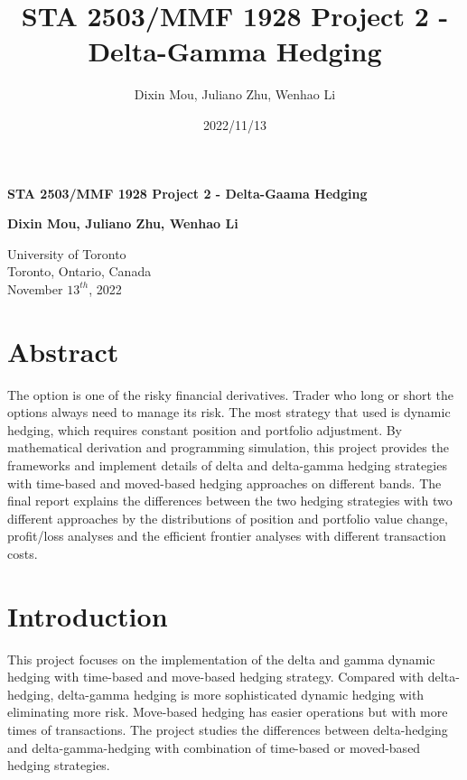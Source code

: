 \documentclass[12pt]{article}
\title{STA 2503/MMF 1928 Project 2 - Delta-Gamma Hedging}
\author{Dixin Mou, Juliano Zhu, Wenhao Li}
\date{2022/11/13}
\begin{document}
\begin{titlepage}
  \begin{center}
      \vspace*{7cm}

      \textbf{STA 2503/MMF 1928 Project 2 - Delta-Gaama Hedging}

           
      \vspace{1.5cm}

      \textbf{Dixin Mou, Juliano Zhu, Wenhao Li}

      \vfill
           
           
      \vspace{0.8cm}
           
      University of Toronto\\
      Toronto, Ontario, Canada\\
      November $13^{th}$, 2022 
           
  \end{center}
\end{titlepage}


\section{Abstract}
The option is one of the risky financial derivatives. Trader who long or short the options always need to manage its risk. The most strategy that used is dynamic hedging, which requires constant position and portfolio adjustment. By mathematical 
derivation and programming simulation, this project provides the frameworks and implement details of delta and delta-gamma hedging strategies with time-based and moved-based hedging approaches on different bands. The final report explains the 
differences between the two hedging strategies with two different approaches by the distributions of position and portfolio value change, profit/loss analyses and the efficient frontier analyses with different transaction costs.

\newpage
\tableofcontents

\newpage
\listoffigures

\newpage
\section{Introduction}
This project focuses on the implementation of the delta and gamma dynamic hedging with time-based and move-based hedging strategy. Compared with delta-hedging, delta-gamma hedging is more sophisticated dynamic hedging with eliminating more risk. 
Move-based hedging has easier operations but with more times of transactions. The project studies the differences between delta-hedging and delta-gamma-hedging with combination of time-based or moved-based hedging strategies.
\end{document}

